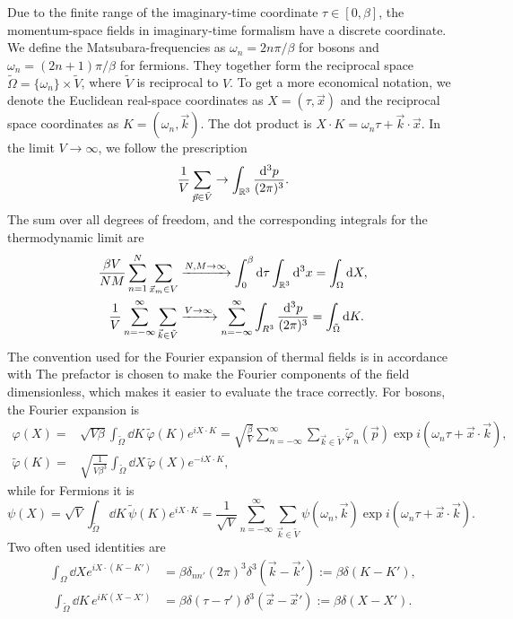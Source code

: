 Due to the finite range of the imaginary-time coordinate $\tau \in [0, \beta]$, the momentum-space fields in imaginary-time formalism have a discrete coordinate. 
We define the Matsubara-frequencies as $\omega_n = 2 n \pi / \beta$ for bosons and $\omega_n = (2n + 1) \pi / \beta$ for fermions.
They together form the reciprocal space $\tilde \Omega = \{\omega_n\}\times \tilde V$, where $\tilde V$ is reciprocal to $V$.
To get a more economical notation, we denote the Euclidean real-space coordinates as $X = (\tau, \vec x)$ and the reciprocal space coordinates as $K = (\omega_n, \vec k)$.
The dot product is $X\cdot K = \omega_n \tau + \vec k \cdot \vec x$.
In the limit $V\rightarrow \infty$, we follow the prescription
\begin{equation*}
    \frac{1}{V} \sum_{\vec p \in \tilde V} \rightarrow \int_{\mathbb{R}^3} 
    \frac{\dd^3 p}{(2 \pi)^3}.
\end{equation*}
The sum over all degrees of freedom, and the corresponding integrals for the thermodynamic limit are
\begin{align*}
     \frac{\beta V}{NM}\sum_{n=1}^N \sum_{\vec x_m \in V} 
    & \xrightarrow{N,M\rightarrow \infty} \int_{0}^\beta \dd \tau \int_{\mathbb{R}^3} \dd^3 x
    = \int_\Omega \dd X, \\
     \frac{1}{V} \sum_{n=-\infty}^\infty \sum_{\vec k \in \tilde V}
    & \xrightarrow{V \rightarrow \infty} \sum_{n=-\infty}^\infty \int_{R^3} \frac{\dd^3 p}{(2 \pi)^3}
    = \int_{\tilde \Omega} \dd K.
\end{align*}
The convention used for the Fourier expansion of thermal fields is in accordance with 
The prefactor is chosen to make the Fourier components of the field dimensionless, which makes it easier to evaluate the trace correctly.
For bosons, the Fourier expansion is
\begin{align*}
    \varphi(X)
    = &
    \sqrt{V \beta} \int_{\tilde \Omega} \dd K \,  \tilde \varphi(K) e^{i X\cdot K}
    =
    \sqrt{\frac{\beta}{V}} \sum_{n=-\infty}^\infty \sum_{\vec k \in \tilde V}
    \tilde \varphi_n(\vec p) \exp{i(\omega_n \tau + \vec x \cdot \vec k)}, \\
    \tilde \varphi(K)
    = &
    \sqrt{\frac{1}{V \beta^3}} \int_{\tilde \Omega} \dd X \,  \tilde \varphi(X) e^{ - i X\cdot K},
\end{align*}
while for Fermions it is
\begin{equation}
    \psi(X) 
    = \sqrt{V} \int_{\tilde \Omega} \dd K \, \tilde \psi(K) e^{i X\cdot K} 
    = \frac{1}{\sqrt{V}} \sum_{n = - \infty}^\infty \sum_{\vec k \in \tilde V}
    \psi(\omega_n, \vec k) \exp{i(\omega_n \tau + \vec x \cdot \vec k)}.
\end{equation}
Two often used identities are
\begin{align}
    \label{thermal delta}
    \int_{\Omega} \dd X e^{i X\cdot(K - K')} 
    & = \beta \delta_{nn'} (2 \pi)^3 \delta^3(\vec k - \vec k') := \beta \delta(K - K'), \\\
    \int_{\tilde \Omega} \dd K \, e^{i K(X - X')} 
    & = \beta \delta (\tau - \tau') \delta^3(\vec x - \vec x') 
    := \beta \delta(X - X').
\end{align}
